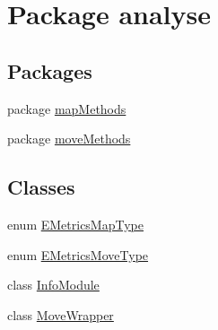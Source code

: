 \hypertarget{namespaceanalyse}{}\section{Package analyse}
\label{namespaceanalyse}
\subsection*{Packages}
\begin{DoxyCompactItemize}
\item 
package \mbox{\hyperlink{namespaceanalyse_1_1map_methods}{map\+Methods}}
\item 
package \mbox{\hyperlink{namespaceanalyse_1_1move_methods}{move\+Methods}}
\end{DoxyCompactItemize}
\subsection*{Classes}
\begin{DoxyCompactItemize}
\item 
enum \mbox{\hyperlink{enumanalyse_1_1_e_metrics_map_type}{E\+Metrics\+Map\+Type}}
\item 
enum \mbox{\hyperlink{enumanalyse_1_1_e_metrics_move_type}{E\+Metrics\+Move\+Type}}
\item 
class \mbox{\hyperlink{classanalyse_1_1_info_module}{Info\+Module}}
\item 
class \mbox{\hyperlink{classanalyse_1_1_move_wrapper}{Move\+Wrapper}}
\end{DoxyCompactItemize}
